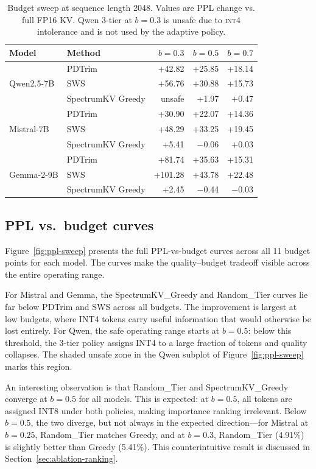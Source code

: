 \documentclass[11pt]{article}
\newcommand{\method}{SpectrumKV}
\newcommand{\budget}{b}
\newcommand{\pct}{\%}
\newcommand{\intiv}{\textsc{int4}}
\theoremstyle{plain}
\theoremstyle{definition}
\begin{document}
\begin{table}[t]
\centering
\caption{Budget sweep at sequence length 2048.  Values are PPL change vs. full FP16 KV.  Qwen 3-tier at $\budget=0.3$ is unsafe due to \intiv{} intolerance and is not used by the adaptive policy.}
\label{tab:budget}
\small
\begin{tabular}{llrrr}
\toprule
Model & Method & $\budget=0.3$ & $\budget=0.5$ & $\budget=0.7$ \\
\midrule
\multirow{3}{*}{Qwen2.5-7B}
  & PDTrim & +42.82 & +25.85 & +18.14 \\
  & SWS & +56.76 & +30.88 & +15.73 \\
  & \method{} Greedy & unsafe & +1.97 & +0.47 \\
\midrule
\multirow{3}{*}{Mistral-7B}
  & PDTrim & +30.90 & +22.07 & +14.36 \\
  & SWS & +48.29 & +33.25 & +19.45 \\
  & \method{} Greedy & +5.41 & $-$0.06 & +0.03 \\
\midrule
\multirow{3}{*}{Gemma-2-9B}
  & PDTrim & +81.74 & +35.63 & +15.31 \\
  & SWS & +101.28 & +43.78 & +22.48 \\
  & \method{} Greedy & +2.45 & $-$0.44 & $-$0.03 \\
\bottomrule
\end{tabular}
\end{table}

\subsection{PPL vs.\ budget curves}
\label{sec:ppl-curves}

Figure~\ref{fig:ppl-sweep} presents the full PPL-vs-budget curves across all 11 budget points for each model.  The curves make the quality--budget tradeoff visible across the entire operating range.

For Mistral and Gemma, the \method{}\_Greedy and Random\_Tier curves lie far below PDTrim and SWS across all budgets.  The improvement is largest at low budgets, where INT4 tokens carry useful information that would otherwise be lost entirely.  For Qwen, the safe operating range starts at $\budget=0.5$: below this threshold, the 3-tier policy assigns INT4 to a large fraction of tokens and quality collapses.  The shaded unsafe zone in the Qwen subplot of Figure~\ref{fig:ppl-sweep} marks this region.

An interesting observation is that Random\_Tier and \method{}\_Greedy converge at $\budget=0.5$ for all models.  This is expected: at $\budget=0.5$, all tokens are assigned INT8 under both policies, making importance ranking irrelevant.  Below $\budget=0.5$, the two diverge, but not always in the expected direction---for Mistral at $\budget=0.25$, Random\_Tier matches Greedy, and at $\budget=0.3$, Random\_Tier (4.91\pct{}) is slightly better than Greedy (5.41\pct{}).  This counterintuitive result is discussed in Section~\ref{sec:ablation-ranking}.
\end{document}
